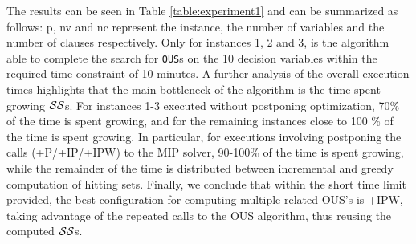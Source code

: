 The results can be seen in Table \ref{table:experiment1} and can be summarized as follows: p, nv and nc represent the instance, the number of variables and the number of clauses respectively. 
Only for instances 1, 2 and 3, is the algorithm able to complete the search for \texttt{OUS}s on the 10 decision variables within the required time constraint of 10 minutes.
A further analysis of the overall execution times highlights that the main bottleneck of the algorithm is the time spent growing $\mathcal{SS}$s. For instances 1-3 executed without postponing optimization, 70\% of the time is spent growing, and for the remaining instances close to 100 \% of the time is spent growing.
In particular, for executions involving postponing the calls (+P/+IP/+IPW) to the MIP solver, 90-100\% of the time is spent growing, while the remainder of the time is distributed between incremental and greedy computation of hitting sets.
Finally, we conclude that within the short time limit provided, the best configuration for computing multiple related OUS's is \omus+IPW, taking advantage of the repeated calls to the OUS algorithm, thus reusing the computed $\mathcal{SS}$s.



